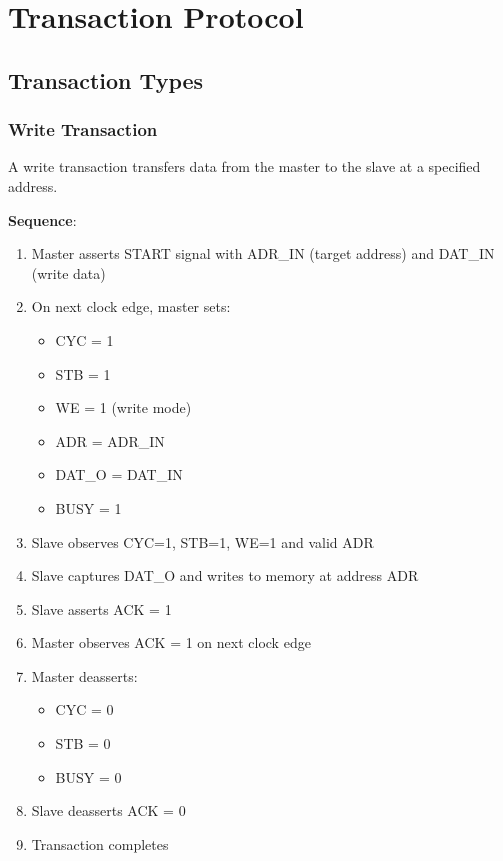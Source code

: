 \documentclass[12pt,a4paper]{article}
\begin{document}
\section{Transaction Protocol}

\subsection{Transaction Types}

\subsubsection{Write Transaction}
A write transaction transfers data from the master to the slave at a specified address.

\textbf{Sequence}:
\begin{enumerate}
    \item Master asserts START signal with ADR\_IN (target address) and DAT\_IN (write data)
    \item On next clock edge, master sets:
    \begin{itemize}
        \item CYC = 1
        \item STB = 1
        \item WE = 1 (write mode)
        \item ADR = ADR\_IN
        \item DAT\_O = DAT\_IN
        \item BUSY = 1
    \end{itemize}
    \item Slave observes CYC=1, STB=1, WE=1 and valid ADR
    \item Slave captures DAT\_O and writes to memory at address ADR
    \item Slave asserts ACK = 1
    \item Master observes ACK = 1 on next clock edge
    \item Master deasserts:
    \begin{itemize}
        \item CYC = 0
        \item STB = 0
        \item BUSY = 0
    \end{itemize}
    \item Slave deasserts ACK = 0
    \item Transaction completes
\end{enumerate}
\end{document}
